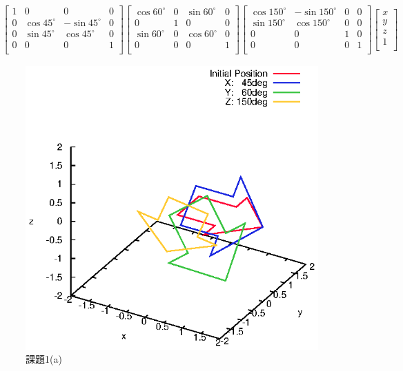 \documentclass[a4paper,10pt]{jsarticle}
\begin{document}
\begin{eqnarray}
\label{eq:a}
  \left[
    \begin{array}{cccc}
      1 & 0 & 0 & 0 \\
      0 & \cos{45^\circ} & -\sin{45^\circ} & 0\\
      0 & \sin{45^\circ} & \cos{45^\circ} & 0\\
      0 & 0 & 0 & 1\\
    \end{array}
  \right]\left[
    \begin{array}{cccc}
      \cos{60^\circ} & 0 & \sin{60^\circ} & 0 \\
      0 & 1 & 0 & 0\\
      \sin{60^\circ} & 0 & \cos{60^\circ} & 0\\
      0 & 0 & 0 & 1\\
    \end{array}
  \right]\left[
    \begin{array}{cccc}
      \cos{150^\circ} & -\sin{150^\circ} & 0 & 0 \\
      \sin{150^\circ} & \cos{150^\circ} & 0 & 0\\
      0 & 0 & 1 & 0\\
      0 & 0 & 0 & 1\\
    \end{array}
  \right]\left[
    \begin{array}{c}
      x\\
      y\\
      z\\
      1\\
    \end{array}
  \right]
\end{eqnarray}

\begin{figure}[tb]
  \begin{center}
    \includegraphics[clip,width=14cm]{fig/eps/1(a).eps}
  \end{center}
  \caption{課題1(a)}
  \label{fig:課題1(a)}
\end{figure}
\end{document}
